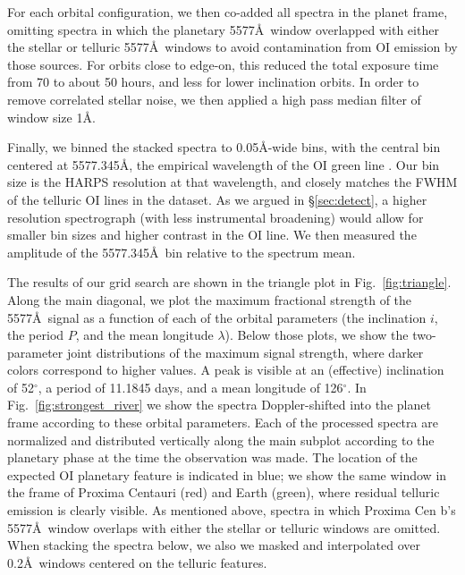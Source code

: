 \documentclass{emulateapj}
\begin{document}
For each orbital configuration, we then co-added all spectra in the planet frame, omitting spectra in which the planetary 5577\AA\ window overlapped with either the stellar or telluric 5577\AA\ windows to avoid contamination from OI emission by those sources. For orbits close to edge-on, this reduced the total exposure time from 70 to about 50 hours, and less for lower inclination orbits. In order to remove correlated stellar noise, we then applied a high pass median filter of window size 1\AA.

Finally, we binned the stacked spectra to 0.05\AA-wide bins, with the central bin centered at 5577.345\AA, the empirical wavelength of the OI green line \citep{CabannesDufay1955,Chamberlain1961}. Our bin size is the HARPS resolution at that wavelength, and closely matches the FWHM of the telluric OI lines in the dataset. As we argued in \S\ref{sec:detect}, a higher resolution spectrograph (with less instrumental broadening) would allow for smaller bin sizes and higher contrast in the OI line. We then measured the amplitude of the 5577.345\AA\ bin relative to the spectrum mean.

The results of our grid search are shown in the triangle plot in Fig.~\ref{fig:triangle}. Along the main diagonal, we plot the maximum fractional strength of the 5577\AA\ signal as a function of each of the orbital parameters (the inclination $i$, the period $P$, and the mean longitude $\lambda$). Below those plots, we show the two-parameter joint distributions of the maximum signal strength, where darker colors correspond to higher values. A peak is visible at an (effective) inclination of 52$^\circ$, a period of 11.1845 days, and a mean longitude of 126$^\circ$. In Fig.~\ref{fig:strongest_river} we show the spectra Doppler-shifted into the planet frame according to these orbital parameters. Each of the processed spectra are normalized and distributed vertically along the main subplot according to the planetary phase at the time the observation was made. The location of the expected OI planetary feature is indicated in blue; we show the same window in the frame of Proxima Centauri (red) and Earth (green), where residual telluric emission is clearly visible. As mentioned above, spectra in which Proxima Cen b's 5577\AA\ window overlaps with either the stellar or telluric windows are omitted. When stacking the spectra below, we also we masked and interpolated over 0.2\AA\ windows centered on the telluric features.
\end{document}
